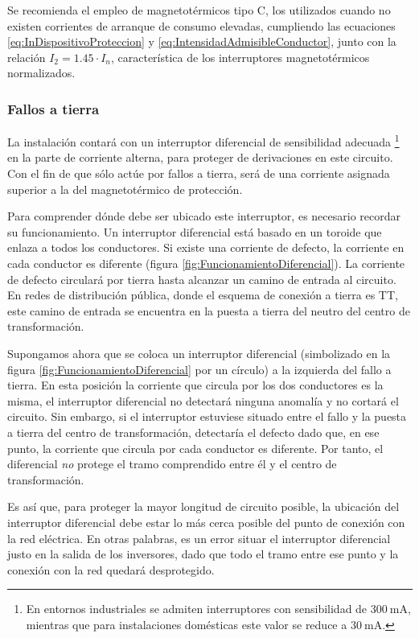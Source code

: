 Se recomienda el empleo de magnetotérmicos tipo C, los utilizados
cuando no existen corrientes de arranque de consumo elevadas, cumpliendo
las ecuaciones \ref{eq:InDispositivoProteccion} y \ref{eq:IntensidadAdmisibleConductor},
junto con la relación $I_{2}=1.45\cdot I_{n}$, característica de
los interruptores magnetotérmicos normalizados.


\subsubsection{Fallos a tierra }

La instalación contará con un interruptor diferencial de sensibilidad
adecuada%
\footnote{En entornos industriales se admiten interruptores con sensibilidad
de $\SI{300}{\milli\ampere}$, mientras que para instalaciones domésticas
este valor se reduce a $\SI{30}{\milli\ampere}$.%
} en la parte de corriente alterna, para proteger de derivaciones en
este circuito. Con el fin de que sólo actúe por fallos a tierra, será
de una corriente asignada superior a la del magnetotérmico de protección. 

Para comprender dónde debe ser ubicado este interruptor, es necesario
recordar su funcionamiento. Un interruptor diferencial está basado en
un toroide que enlaza a todos los conductores. Si existe una corriente
de defecto, la corriente en cada conductor es diferente (figura
\ref{fig:FuncionamientoDiferencial}).  La corriente de defecto
circulará por tierra hasta alcanzar un camino de entrada al
circuito. En redes de distribución pública, donde el esquema de
conexión a tierra es TT, este camino de entrada se encuentra en la
puesta a tierra del neutro del centro de transformación. 

Supongamos ahora que se coloca un interruptor diferencial (simbolizado
en la figura \ref{fig:FuncionamientoDiferencial} por un círculo) a la
izquierda del fallo a tierra. En esta posición la corriente que
circula por los dos conductores es la misma, el interruptor
diferencial no detectará ninguna anomalía y no cortará el
circuito. Sin embargo, si el interruptor estuviese situado entre el
fallo y la puesta a tierra del centro de transformación, detectaría el
defecto dado que, en ese punto, la corriente que circula por cada
conductor es diferente. Por tanto, el diferencial \emph{no} protege el
tramo comprendido entre él y el centro de transformación. 

Es así que, para proteger la mayor longitud de circuito posible, la
ubicación del interruptor diferencial debe estar lo más cerca posible
del punto de conexión con la red eléctrica. En otras palabras, es un
error situar el interruptor diferencial justo en la salida de los
inversores, dado que todo el tramo entre ese punto y la conexión con
la red quedará desprotegido.

